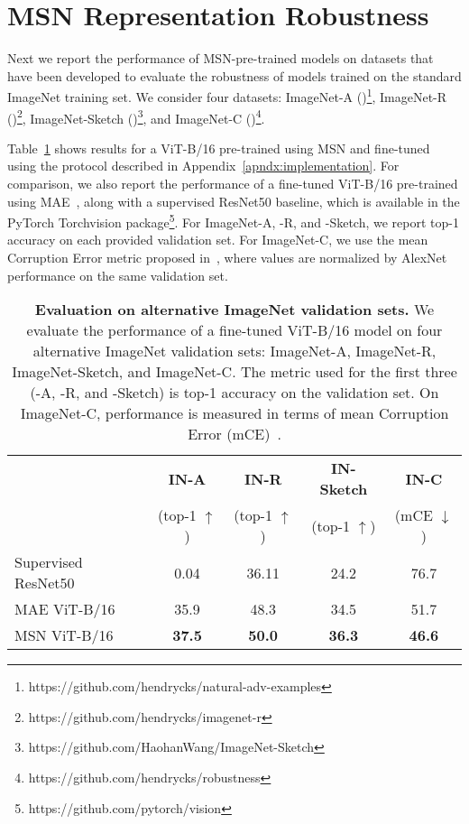 \documentclass{article}
\begin{document}
\section{MSN Representation Robustness}

Next we report the performance of MSN-pre-trained models on datasets that have been developed to evaluate the robustness of models trained on the standard ImageNet training set. We consider four datasets: ImageNet-A (\citet{hendrycks2021nae})\footnote{https://github.com/hendrycks/natural-adv-examples}, 
ImageNet-R (\citet{hendrycks2021many})\footnote{https://github.com/hendrycks/imagenet-r},
ImageNet-Sketch (\citet{wang2019learning})\footnote{https://github.com/HaohanWang/ImageNet-Sketch}, and
ImageNet-C (\citet{hendrycks2019robustness})\footnote{https://github.com/hendrycks/robustness}.

Table~\ref{tb:robustness} shows results for a ViT-B/16 pre-trained using MSN and fine-tuned using the protocol described in Appendix~\ref{apndx:implementation}. For comparison, we also report the performance of a fine-tuned ViT-B/16 pre-trained using MAE~\citep{he2021masked}, along with a supervised ResNet50 baseline, which is available in the PyTorch Torchvision package\footnote{https://github.com/pytorch/vision}. For ImageNet-A, -R, and -Sketch, we report top-1 accuracy on each provided validation set. For ImageNet-C, we use the mean Corruption Error metric proposed in~\citep{hendrycks2019robustness}, where values are normalized by AlexNet performance on the same validation set.
\begin{table}[h]
  \centering
  \caption{{\bf Evaluation on alternative ImageNet validation sets.} We evaluate the performance of a fine-tuned ViT-B/16 model on four alternative ImageNet validation sets: ImageNet-A, ImageNet-R, ImageNet-Sketch, and ImageNet-C. The metric used for the first three (-A, -R, and -Sketch) is top-1 accuracy on the validation set. On ImageNet-C, performance is measured in terms of mean Corruption Error (mCE)~\citep{hendrycks2019robustness}.}
  \label{tb:robustness}
       \begin{tabular}{l c c c c}
        & \bf IN-A & \bf IN-R & \bf IN-Sketch & \bf IN-C \\
        & (top-1 $\uparrow$) & (top-1 $\uparrow$)& (top-1 $\uparrow$) & (mCE $\downarrow$)\\ \midrule
        Supervised ResNet50 & 0.04 & 36.11  & 24.2 & 76.7 \\ 
        MAE ViT-B/16~\citep{he2021masked} & 35.9 & 48.3 & 34.5 & 51.7 \\ \midrule
        MSN ViT-B/16 & \bf\cellcolor{fbApp} 37.5 & \bf\cellcolor{fbApp} 50.0 & \bf\cellcolor{fbApp} 36.3 & \bf\cellcolor{fbApp} 46.6 \\ \bottomrule
    \end{tabular}
\end{table}
\end{document}
